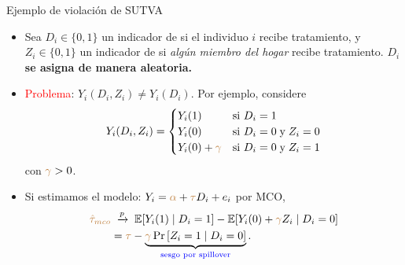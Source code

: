 \documentclass[10pt, xcolor=dvipsnames]{beamer}
\begin{document}
\begin{frame}{Ejemplo de violación de SUTVA}
\begin{itemize}
    \item Sea $D_i \in \{0,1\}$ un indicador de si el individuo $i$ recibe tratamiento, y 
    $Z_i \in \{0,1\}$ un indicador de si \emph{algún miembro del hogar} recibe tratamiento. $D_i$ \textbf{se asigna de manera aleatoria.}
    \vspace{1em}
    \item \textcolor{red}{Problema}: \(Y_i(D_i, Z_i) \neq Y_i(D_i)\). Por ejemplo, considere
    \begin{align*}
    Y_i(D_i,Z_i) =
    \begin{cases}
        Y_i(1) & \text{si } D_i=1\\
        Y_i(0) & \text{si } D_i=0 \;\text{y}\; Z_i=0 \\
        Y_i(0)+\textcolor{brown}{\gamma} & \text{si } D_i=0 \;\text{y}\; Z_i=1
    \end{cases}    
    \end{align*}
    \vspace{-0.5em}
    con \(\textcolor{brown}{\gamma}>0\).
    \vspace{0.75em}
    \item Si estimamos el modelo: \(Y_i = \textcolor{brown}{\alpha} + \textcolor{brown}{\tau} D_i + e_i\) por MCO, 
    \begin{align*}
        \textcolor{brown}{\hat{\tau}_{mco}} &\;\xrightarrow{p}\; \operatorname{\mathbb{E}}[Y_i(1)\mid D_i=1] - \operatorname{\mathbb{E}}[Y_i(0)+\textcolor{brown}{\gamma} Z_i\mid D_i=0] \\
        &= \textcolor{brown}{\tau} - \underbrace{\textcolor{brown}{\gamma}\,\text{Pr}\left[Z_i=1\mid D_i=0\right]}_{\text{\textcolor{blue}{sesgo por spillover}}}.
    \end{align*}
\end{itemize}
\end{frame}
\end{document}
